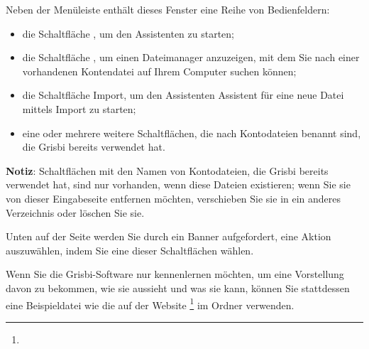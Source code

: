 
Neben der Menüleiste enthält dieses Fenster eine Reihe von Bedienfeldern:%

\begin{itemize}
	\item die Schaltfläche , um den Assistenten  zu starten;%
	\item die Schaltfläche , um einen Dateimanager anzuzeigen, mit dem Sie nach einer vorhandenen Kontendatei auf Ihrem Computer suchen können;%
	\item die Schaltfläche {Import}, um den Assistenten {Assistent für eine neue Datei mittels Import} zu starten;%
	\item eine oder mehrere weitere Schaltflächen, die nach Kontodateien benannt sind, die Grisbi bereits verwendet hat.%
\end{itemize}


\textbf{Notiz}: Schaltflächen mit den Namen von Kontodateien, die Grisbi bereits verwendet hat, sind nur vorhanden, wenn diese Dateien existieren; wenn Sie sie von dieser Eingabeseite entfernen möchten, verschieben Sie sie in ein anderes Verzeichnis oder löschen Sie sie.%


Unten auf der Seite werden Sie durch ein Banner aufgefordert, eine Aktion auszuwählen, indem Sie eine dieser Schaltflächen wählen.%


Wenn Sie die Grisbi-Software nur kennenlernen möchten, um eine Vorstellung davon zu bekommen, wie sie aussieht und was sie kann, können Sie stattdessen eine Beispieldatei wie die auf der Website \footnote{\urlSourceForgeDocumentation{}} im Ordner  verwenden.%

